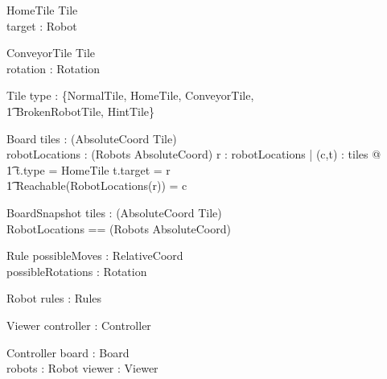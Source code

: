 \documentclass[12pt]{article}
\begin{document}
\begin{schema}{HomeTile}
Tile \\
target : Robot
\end{schema}

\begin{schema}{ConveyorTile}
Tile \\
rotation : Rotation
\end{schema}

\begin{schema}{Tile}
type : \{NormalTile, HomeTile, ConveyorTile, \\ \t1 BrokenRobotTile, HintTile\}
\end{schema}

\begin{schema}{Board}
tiles : \power (AbsoluteCoord \fun Tile) \\
robotLocations : \power (Robots \fun AbsoluteCoord)
\where
\forall r : \dom robotLocations | \exists (c,t) : tiles @  \\ \t1 t.type = HomeTile \wedge t.target = r \wedge \\ \t1 Reachable(RobotLocations(r)) = c
\end{schema}

\begin{schema}{BoardSnapshot}
tiles : \power (AbsoluteCoord \fun Tile) \\
RobotLocations == \power (Robots \fun AbsoluteCoord)
\end{schema}

\begin{schema}{Rule}
possibleMoves : \power RelativeCoord \\
possibleRotations : \power Rotation
\end{schema}

\begin{schema}{Robot}
rules : Rules
\end{schema}

\begin{schema}{Viewer}
controller : Controller
\end{schema}

\begin{schema}{Controller}
board : Board \\
robots : \power Robot
viewer : Viewer
\end{schema}
\end{document}
